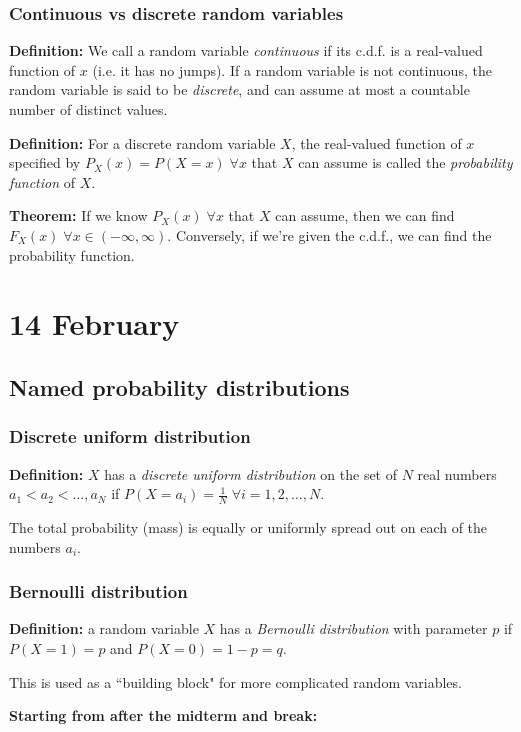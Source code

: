 \documentclass[12pt]{article}
\begin{document}
\subsubsection{Continuous vs discrete random variables}
\textbf{Definition:} We call a random variable \emph{continuous} if its c.d.f. is a real-valued function of $x$ (i.e. it has no jumps). If a random variable is not continuous, the random variable is said to be \emph{discrete}, and can assume at most a countable number of distinct values.

\textbf{Definition:} For a discrete random variable $X$, the real-valued function of $x$ specified by $P_X (x) = P(X = x) \; \forall x$ that $X$ can assume is called the \emph{probability function} of $X$.

\textbf{Theorem:} If we know $P_X (x) \; \forall x$ that $X$ can assume, then we can find $F_X (x) \; \forall x \in (-\infty, \infty)$. Conversely, if we're given the c.d.f., we can find the probability function.

\section{14 February} 
\subsection{Named probability distributions}
\subsubsection{Discrete uniform distribution}
\textbf{Definition:} $X$ has a \emph{discrete uniform distribution} on the set of $N$ real numbers $a_1 < a_2 < \dots, a_N$ if $P(X = a_i) = \frac{1}{N} \; \forall i = 1, 2, \dots, N$.

The total probability (mass) is equally or uniformly spread out on each of the numbers $a_i$. 

\subsubsection{Bernoulli distribution}
\textbf{Definition:} a random variable $X$ has a \emph{Bernoulli distribution} with parameter $p$ if $P(X = 1) = p$ and $P(X = 0) = 1 - p = q$.

This is used as a ``building block" for more complicated random variables. 


\newpage
\textbf{Starting from after the midterm and break:}
\end{document}
